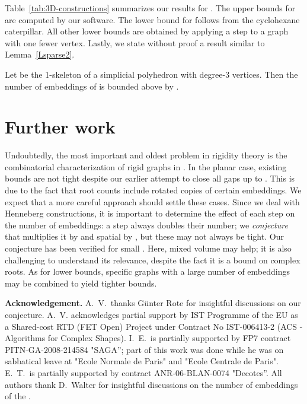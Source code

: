 \documentclass[envcountsame]{llncs}
\begin{document}
Table~\ref{tab:3D-constructions} summarizes our results for .
The upper bounds for  are computed by our software.
The lower bound for  follows from the cyclohexane caterpillar.
All  other lower bounds are 
obtained by applying a  step to a graph with one fewer vertex.
Lastly, we state without proof  a result similar to Lemma~\ref{Lsparse2}. 

\begin{lemma}\label{Lsparse3}
  Let  be the 1-skeleton of a simplicial polyhedron with  
  degree-3 vertices.
  Then the number of embeddings of  is bounded above by .
\end{lemma}


\section{Further work}

Undoubtedly, the most important and oldest problem in rigidity theory
is the combinatorial characterization of rigid graphs in .
In the planar case, existing bounds are not tight despite our earlier
attempt to close all gaps up to . This is due to the fact that
root counts include rotated copies of certain embeddings. We expect
that a more careful approach should settle these cases.
Since we deal with Henneberg constructions,
it is important to determine the effect of each step on the number of embeddings:
a  step always doubles their number;
we {\em conjecture} that  multiplies it by  and spatial  by ,
but these may not always be tight.
Our conjecture has been verified for small .
Here, mixed volume may help; it is also challenging to understand
its relevance, despite the fact it is a bound on complex roots.
As for lower bounds, specific graphs with a large number of
embeddings may be combined to yield tighter bounds.

\medskip

\noindent
\textbf{Acknowledgement.}
A.~V.\ thanks G\"unter Rote for insightful discussions on our conjecture. 
A.~V. acknowledges partial support 
by IST Programme of the EU as a Shared-cost RTD (FET Open) Project under Contract 
No IST-006413-2 (ACS - Algorithms for Complex Shapes).
I.~E.\ is partially supported by FP7 contract PITN-GA-2008-214584 "SAGA''; part of this work was done while he was on sabbatical
leave at "Ecole Normale de Paris" and "Ecole Centrale de Paris".
E.~T.\ is partially supported by contract ANR-06-BLAN-0074 "Decotes''. All authors thank D.~Walter for insightful discussions 
on the number of embeddings of the .


\end{document}
